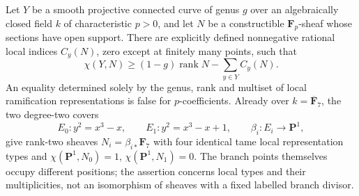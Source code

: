 \begin{theorem}\label{thm:B3-pprimary}
Let $Y$ be a smooth projective connected curve of genus $g$ over an
algebraically closed field $k$ of characteristic $p>0$, and let $N$
be a constructible $\mathbf F_p$-sheaf whose sections have open support.
There are explicitly defined nonnegative rational local indices $C_y(N)$,
zero except at finitely many points, such that
\[
 \chi(Y,N)\ge (1-g)\operatorname{rank}N-\sum_{y\in Y}C_y(N).
\]
An equality determined solely by the genus, rank and multiset of local
ramification representations is false for $p$-coefficients.
Already over $k=\overline{\mathbf F}_7$, the two degree-two covers
\[
 E_0:y^2=x^3-x,\qquad E_1:y^2=x^3-x+1,
 \qquad\beta_i:E_i\longrightarrow\mathbf P^1,
\]
give rank-two sheaves $N_i=\beta_{i*}\mathbf F_7$ with four identical
tame local representation types and
$\chi(\mathbf P^1,N_0)=1$, $\chi(\mathbf P^1,N_1)=0$.
The branch points themselves occupy different positions; the assertion
concerns local types and their multiplicities, not an isomorphism of
sheaves with a fixed labelled branch divisor.
\end{theorem}
